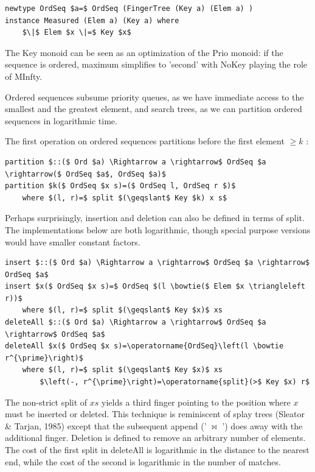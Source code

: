 \documentclass[10pt]{article}
\begin{document}
\begin{verbatim}
newtype OrdSeq $a=$ OrdSeq (FingerTree (Key a) (Elem a) )
instance Measured (Elem a) (Key a) where
    $\|$ Elem $x \|=$ Key $x$
\end{verbatim}

The Key monoid can be seen as an optimization of the Prio monoid: if the sequence is ordered, maximum simplifies to 'second' with NoKey playing the role of MInfty.

Ordered sequences subsume priority queues, as we have immediate access to the smallest and the greatest element, and search trees, as we can partition ordered sequences in logarithmic time.

The first operation on ordered sequences partitions before the first element $\geqslant k$ :

\begin{verbatim}
partition $::($ Ord $a) \Rightarrow a \rightarrow$ OrdSeq $a \rightarrow($ OrdSeq $a$, OrdSeq $a)$
partition $k($ OrdSeq $x s)=($ OrdSeq l, OrdSeq r $)$
    where $(l, r)=$ split $(\geqslant$ Key $k) x s$
\end{verbatim}

Perhaps surprisingly, insertion and deletion can also be defined in terms of split. The implementations below are both logarithmic, though special purpose versions would have smaller constant factors.

\begin{verbatim}
insert $::($ Ord $a) \Rightarrow a \rightarrow$ OrdSeq $a \rightarrow$ OrdSeq $a$
insert $x($ OrdSeq $x s)=$ OrdSeq $(l \bowtie($ Elem $x \triangleleft r))$
    where $(l, r)=$ split $(\geqslant$ Key $x)$ xs
deleteAll $::($ Ord $a) \Rightarrow a \rightarrow$ OrdSeq $a \rightarrow$ OrdSeq $a$
deleteAll $x($ OrdSeq $x s)=\operatorname{OrdSeq}\left(l \bowtie r^{\prime}\right)$
    where $(l, r)=$ split $(\geqslant$ Key $x)$ xs
        $\left(-, r^{\prime}\right)=\operatorname{split}(>$ Key $x) r$
\end{verbatim}

The non-strict split of $x s$ yields a third finger pointing to the position where $x$ must be inserted or deleted. This technique is reminiscent of splay trees (Sleator \& Tarjan, 1985) except that the subsequent append (' $\bowtie$ ') does away with the additional finger. Deletion is defined to remove an arbitrary number of elements. The cost of the first split in deleteAll is logarithmic in the distance to the nearest end, while the cost of the second is logarithmic in the number of matches.
\end{document}
